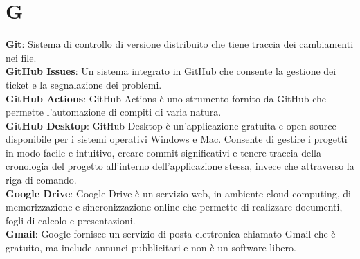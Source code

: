 \section{G}
\textbf{Git}: Sistema di controllo di versione distribuito che tiene traccia dei cambiamenti nei file.\\
\textbf{GitHub Issues}: Un sistema integrato in GitHub che consente la gestione dei ticket e la segnalazione
dei problemi.\\
\textbf{GitHub Actions}: GitHub Actions è uno strumento fornito da GitHub che permette l’automazione di
compiti di varia natura.\\
\textbf{GitHub Desktop}: GitHub Desktop è un'applicazione gratuita e open source disponibile per i sistemi operativi Windows e Mac. Consente di gestire i progetti in modo facile e intuitivo, creare commit significativi e tenere traccia della cronologia del progetto all'interno dell'applicazione stessa, invece che attraverso la riga di comando.\\
\textbf{Google Drive}: Google Drive è un servizio web, in ambiente cloud computing, di memorizzazione e
sincronizzazione online che permette di realizzare documenti, fogli di calcolo e presentazioni.\\
\textbf{Gmail}: Google fornisce un servizio di posta elettronica chiamato Gmail che è gratuito, ma include annunci pubblicitari e non è un software libero.\\